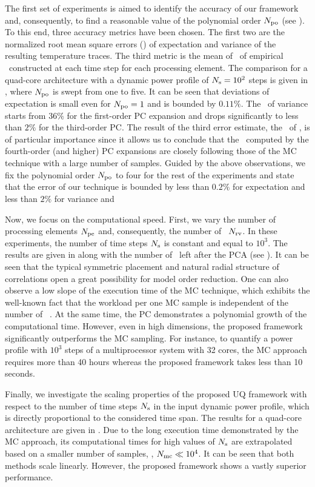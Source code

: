 
The first set of experiments is aimed to identify the accuracy of our framework and, consequently, to find a reasonable value of the polynomial order ${N_\text{po}}$ (see ). To this end, three accuracy metrics have been chosen. The first two are the normalized root mean square errors (\nrmses) of expectation and variance of the resulting temperature traces. The third metric is the mean of \nrmse\ of empirical \pdfs\ constructed at each time step for each processing element. The comparison for a quad-core architecture with a dynamic power profile of $N_\text{s} = 10^2$ steps is given in , where ${N_\text{po}}$ is swept from one to five. It can be seen that deviations of expectation is small even for ${N_\text{po}} = 1$ and is bounded by $0.11\%$. The \nrmse\ of variance starts from $36\%$ for the first-order PC expansion and drops significantly to less than $2\%$ for the third-order PC. The result of the third error estimate, the \nrmse\ of \pdfs, is of particular importance since it allows us to conclude that the \pdfs\ computed by the fourth-order (and higher) PC expansions are closely following those of the MC technique with a large number of samples. Guided by the above observations, we fix the polynomial order ${N_\text{po}}$ to four for the rest of the experiments and state that the error of our technique is bounded by less than $0.2\%$ for expectation and less than $2\%$ for variance and \pdf


Now, we focus on the computational speed. First, we vary the number of processing elements ${N_\text{pe}}$ and, consequently, the number of \rvs\ ${N_\text{rv}}$. In these experiments, the number of time steps $N_\text{s}$ is constant and equal to $10^3$. The results are given in  along with the number of \rvs\ left after the PCA (see ). It can be seen that the typical symmetric placement and natural radial structure of correlations \cite{cheng2011} open a great possibility for model order reduction. One can also observe a low slope of the execution time of the MC technique, which exhibits the well-known fact that the workload per one MC sample is independent of the number of \rvs\ \cite{maitre2010}. At the same time, the PC demonstrates a polynomial growth \cite{heiss2008} of the computational time. However, even in high dimensions, the proposed framework significantly outperforms the MC sampling. For instance, to quantify a power profile with $10^3$ steps of a multiprocessor system with 32 cores, the MC approach requires more than 40 hours whereas the proposed framework takes less than 10 seconds.

Finally, we investigate the scaling properties of the proposed UQ framework with respect to the number of time steps $N_\text{s}$ in the input dynamic power profile, which is directly proportional to the considered time span. The results for a quad-core architecture are given in . Due to the long execution time demonstrated by the MC approach, its computational times for high values of $N_\text{s}$ are extrapolated based on a smaller number of samples, \ie, $N_\text{mc} \ll 10^4$. It can be seen that both methods scale linearly. However, the proposed framework shows a vastly superior performance.
